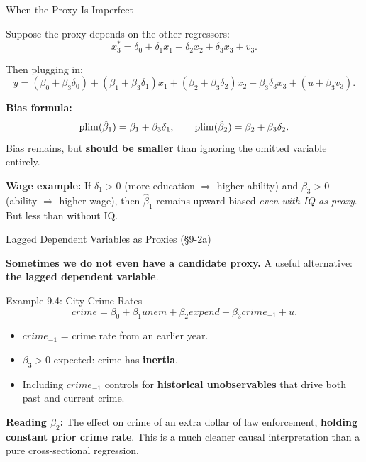 \documentclass[aspectratio=169, 12pt]{beamer}
\begin{document}
\begin{frame}[shrink=10]{When the Proxy Is Imperfect}

  Suppose the proxy depends on the other regressors:
  \[
    x_3^* = \delta_0 + \delta_1 x_1 + \delta_2 x_2 + \delta_3 x_3 + v_3.
    \tag{9.14}
  \]

  Then plugging in:
  \[
    y = (\beta_0 + \beta_3 \delta_0) + (\beta_1 + \beta_3 \delta_1) x_1
    + (\beta_2 + \beta_3 \delta_2) x_2 + \beta_3 \delta_3 x_3 + (u + \beta_3 v_3).
  \]

  \begin{highlightbox}
    \textbf{Bias formula:}
    \[
      \operatorname{plim}(\hat{\beta}_1) = \beta_1 + \beta_3 \delta_1,\qquad
      \operatorname{plim}(\hat{\beta}_2) = \beta_2 + \beta_3 \delta_2.
    \]
    Bias remains, but \textbf{should be smaller} than ignoring the omitted variable entirely.
  \end{highlightbox}

  \textbf{Wage example:} If $\delta_1 > 0$ (more education $\Rightarrow$ higher ability) and
  $\beta_3 > 0$ (ability $\Rightarrow$ higher wage), then $\hat{\beta}_1$ remains
  upward biased \emph{even with IQ as proxy}. But less than without IQ.

\end{frame}

\begin{frame}[shrink=15]{Lagged Dependent Variables as Proxies (\S9-2a)}

  \textbf{Sometimes we do not even have a candidate proxy.} A useful alternative:
  \textbf{the lagged dependent variable}.

  \begin{examplebox}{Example 9.4: City Crime Rates}
    \[
      crime = \beta_0 + \beta_1 \mathit{unem} + \beta_2 \mathit{expend} + \beta_3 \mathit{crime}_{-1} + u. \tag{9.16}
    \]
    \begin{itemize}\setlength{\itemsep}{1pt}
      \item $crime_{-1}$ = crime rate from an earlier year.
      \item $\beta_3 > 0$ expected: crime has \textbf{inertia}.
      \item Including $crime_{-1}$ controls for \textbf{historical unobservables} that
      drive both past and current crime.
    \end{itemize}
  \end{examplebox}

  \begin{keybox}
    \textbf{Reading $\beta_2$:} The effect on crime of an extra dollar of law enforcement,
    \textbf{holding constant prior crime rate}. This is a much cleaner causal interpretation
    than a pure cross-sectional regression.
  \end{keybox}

\end{frame}
\end{document}
